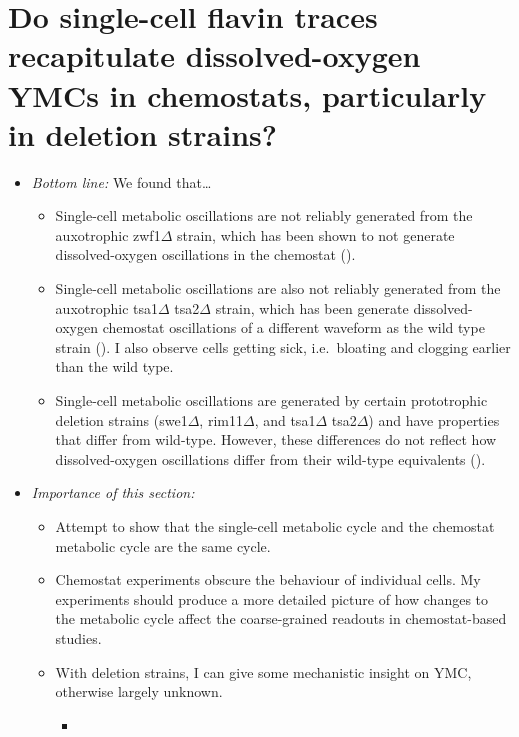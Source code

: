 \section{Do single-cell flavin traces recapitulate dissolved-oxygen YMCs in chemostats, particularly in deletion strains?}
\label{sec:biology-deletions}

\begin{itemize}
\item \emph{Bottom line:} We found that\ldots{}
\begin{itemize}
\item Single-cell metabolic oscillations are not reliably generated from the auxotrophic zwf1\(\Delta\) strain, which has been shown to not generate dissolved-oxygen oscillations in the chemostat (\cite{tuCyclicChangesMetabolic2007}).
\item Single-cell metabolic oscillations are also not reliably generated from the auxotrophic tsa1\(\Delta\) tsa2\(\Delta\) strain, which has been generate dissolved-oxygen chemostat oscillations of a different waveform as the wild type strain (\cite{caustonMetabolicCyclesYeast2015}).  I also observe cells getting sick, i.e.\ bloating and clogging earlier than the wild type.
\item Single-cell metabolic oscillations are generated by certain prototrophic deletion strains (swe1\(\Delta\), rim11\(\Delta\), and tsa1\(\Delta\) tsa2\(\Delta\)) and have properties that differ from wild-type.  However, these differences do not reflect how dissolved-oxygen oscillations differ from their wild-type equivalents (\cite{caustonMetabolicCyclesYeast2015}).
\end{itemize}
\item \emph{Importance of this section:}
\begin{itemize}
\item Attempt to show that the single-cell metabolic cycle and the chemostat metabolic cycle are the same cycle.
\item Chemostat experiments obscure the behaviour of individual cells.  My experiments should produce a more detailed picture of how changes to the metabolic cycle affect the coarse-grained readouts in chemostat-based studies.
\item With deletion strains, I can give some mechanistic insight on YMC, otherwise largely unknown.
\begin{itemize}
\item \cite{tuCyclicChangesMetabolic2007}
\begin{itemize}

\end{itemize}
\end{itemize}
\end{itemize}
\end{itemize}
